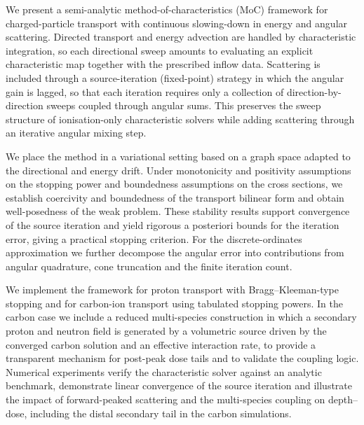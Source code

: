 \documentclass[final]{amsart}
\begin{document}
We present a semi-analytic method-of-characteristics (MoC) framework
for charged-particle transport with continuous slowing-down in energy
and angular scattering. Directed transport and energy advection are
handled by characteristic integration, so each directional sweep
amounts to evaluating an explicit characteristic map together with the
prescribed inflow data. Scattering is included through a
source-iteration (fixed-point) strategy in which the angular gain is
lagged, so that each iteration requires only a collection of
direction-by-direction sweeps coupled through angular sums. This
preserves the sweep structure of ionisation-only characteristic
solvers while adding scattering through an iterative angular mixing
step.

We place the method in a variational setting based on a graph space
adapted to the directional and energy drift. Under monotonicity and
positivity assumptions on the stopping power and boundedness
assumptions on the cross sections, we establish coercivity and
boundedness of the transport bilinear form and obtain well-posedness
of the weak problem. These stability results support convergence of
the source iteration and yield rigorous a posteriori bounds for the
iteration error, giving a practical stopping criterion. For the
discrete-ordinates approximation we further decompose the angular
error into contributions from angular quadrature, cone truncation and
the finite iteration count.

We implement the framework for proton transport with
Bragg--Kleeman-type stopping and for carbon-ion transport using
tabulated stopping powers. In the carbon case we include a reduced
multi-species construction in which a secondary proton and neutron
field is generated by a volumetric source driven by the converged
carbon solution and an effective interaction rate, to provide a
transparent mechanism for post-peak dose tails and to validate the
coupling logic. Numerical experiments verify the characteristic solver
against an analytic benchmark, demonstrate linear convergence of the
source iteration and illustrate the impact of forward-peaked
scattering and the multi-species coupling on depth--dose, including
the distal secondary tail in the carbon simulations.
\end{document}
